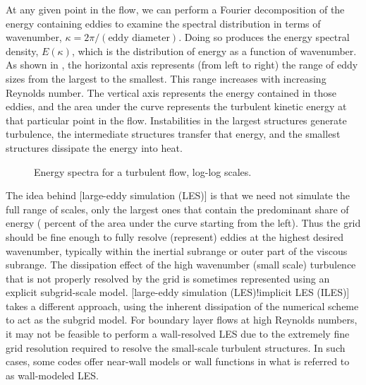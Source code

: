 
At any given point in the flow, we can perform a Fourier decomposition of
the energy containing eddies to examine the spectral distribution in terms of
wavenumber, $\kappa = 2 \pi / (\text{eddy diameter})$.
%
Doing so produces the energy spectral density, $E(\kappa)$, which is the
distribution of energy as a function of wavenumber.
%
As shown in , the horizontal axis represents
(from left to right) the range of eddy sizes from the largest to the
smallest.
%
This range increases with increasing Reynolds number.
%
The vertical axis represents the energy contained in those eddies,
and the area under the curve represents the turbulent kinetic energy
at that particular point in the flow.
%
Instabilities in the largest structures generate turbulence,
the intermediate structures transfer that energy, and
the smallest structures dissipate the energy into heat.


\begin{figure}
  \begin{centering}
    \caption[Energy spectra for a turbulent flow.]%
            {Energy spectra for a turbulent flow, log-log scales.}
    \label{FIG:EnergySpectra}
  \end{centering}
\end{figure}


The idea behind
[large-eddy simulation (LES)]
is that we need not simulate the full range of scales, only the largest ones
that contain the predominant share of energy
( percent of the area under the curve starting from the left).
%
Thus the grid should be fine enough to fully resolve (\thatis represent)
eddies at the highest desired wavenumber, typically within the inertial
subrange or outer part of the viscous subrange.
%
The dissipation effect of the high wavenumber (small scale) turbulence that
is not properly resolved by the grid is sometimes represented using an
explicit subgrid-scale model.
%
%
     [large-eddy simulation (LES)!implicit LES (ILES)]
takes a different approach, using the inherent dissipation of the
numerical scheme to act as the subgrid model.
%
For boundary layer flows at high Reynolds numbers, it may not be feasible to
perform a wall-resolved LES due to the extremely fine grid resolution
required to resolve the small-scale turbulent structures.
%
In such cases, some codes offer near-wall models or wall functions
in what is referred to as wall-modeled LES.

